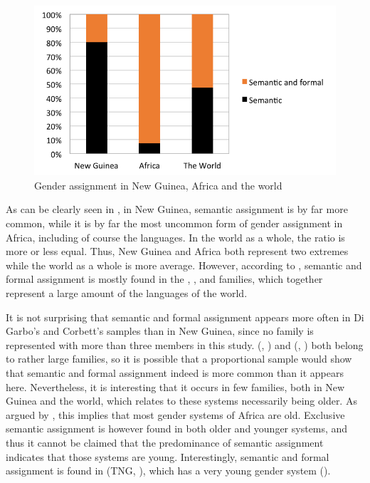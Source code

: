 \documentclass[output=collectionpaper]{langsci/langscibook}
\begin{document}
\begin{figure}
\includegraphics[width=.8\textwidth]{figures/09/fig9.png}
\caption{Gender assignment in New Guinea, Africa and the world}
\label{fig:Svard:9}


\end{figure}


As can be clearly seen in , in New Guinea, semantic assignment is by far more common, while it is by far the most uncommon form of gender assignment in Africa, including of course the  languages. In the world as a whole, the ratio is more or less equal. Thus, New Guinea and Africa both represent two extremes while the world as a whole is more average. However, according to \citet{Corbett2013b}, semantic and formal assignment is mostly found in the , , and  families, which together represent a large amount of the languages of the world.



It is not surprising that semantic and formal assignment appears more often in Di Garbo's and Corbett's samples than in New Guinea, since no family is represented with more than three members in this study.  (, ) and  (, ) both belong to rather large families, so it is possible that a proportional sample would show that semantic and formal assignment indeed is more common than it appears here. Nevertheless, it is interesting that it occurs in few families, both in New Guinea and the world, which \citet{Corbett2013b} relates to these systems necessarily being older. As argued by \citet{Luraghi2011}, this implies that most gender systems of Africa are old. Exclusive semantic assignment is however found in both older and younger systems, and thus it cannot be claimed that the predominance of semantic assignment indicates that those systems are young. Interestingly, semantic and formal assignment is found in  (TNG, ), which has a very young gender system (\citealt{Waelchli2018}).
\end{document}

